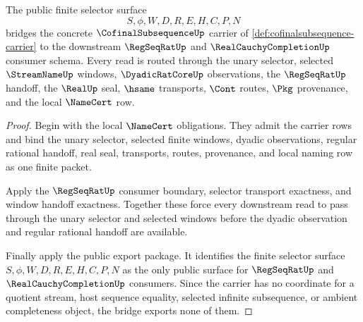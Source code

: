\begin{theorem}
\label{thm:cofinalsubsequence-bridge-selector-schema}
The public finite selector surface
$$
S,\phi,W,D,R,E,H,C,P,N
$$
bridges the concrete $\CofinalSubsequenceUp$ carrier of \autoref{def:cofinalsubsequence-carrier} to the downstream $\RegSeqRatUp$ and $\RealCauchyCompletionUp$ consumer schema. Every read is routed through the unary selector, selected $\StreamNameUp$ windows, $\DyadicRatCoreUp$ observations, the $\RegSeqRatUp$ handoff, the $\RealUp$ seal, $\hsame$ transports, $\Cont$ routes, $\Pkg$ provenance, and the local $\NameCert$ row.
\end{theorem}
\begin{proof}
Begin with the local $\NameCert$ obligations. They admit the carrier rows and bind the unary selector, selected finite windows, dyadic observations, regular rational handoff, real seal, transports, routes, provenance, and local naming row as one finite packet.

Apply the $\RegSeqRatUp$ consumer boundary, selector transport exactness, and window handoff exactness. Together these force every downstream read to pass through the unary selector and selected windows before the dyadic observation and regular rational handoff are available.

Finally apply the public export package. It identifies the finite selector surface $S,\phi,W,D,R,E,H,C,P,N$ as the only public surface for $\RegSeqRatUp$ and $\RealCauchyCompletionUp$ consumers. Since the carrier has no coordinate for a quotient stream, host sequence equality, selected infinite subsequence, or ambient completeness object, the bridge exports none of them.
\end{proof}


